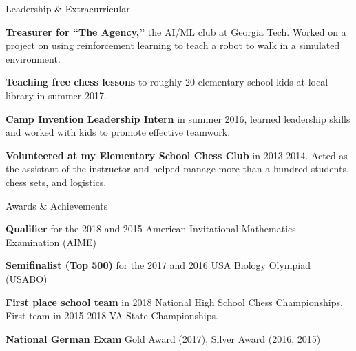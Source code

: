 \documentclass{template} %
\begin{document}
\begin{rSection}{Leadership \& Extracurricular} \itemsep -3pt \vspace{-3mm}
\item {\bf Treasurer for ``The Agency,''} the AI/ML club at Georgia Tech. Worked on a project on using reinforcement learning to teach a robot to walk in a simulated environment.
\item {\bf Teaching free chess lessons} to roughly 20 elementary school kids at local library in summer 2017.
\item {\bf Camp Invention Leadership Intern} in summer 2016, learned leadership skills and worked with kids to promote effective teamwork.
\item {\bf Volunteered at my Elementary School Chess Club} in 2013-2014. Acted as the assistant of the instructor and helped manage more than a hundred students, chess sets, and logistics.
\end{rSection}


\begin{rSection}{Awards \& Achievements} \itemsep -3pt \vspace{-3mm}
\item {\bf Qualifier} for the 2018 and 2015 American Invitational Mathematics Examination (AIME)
\item {\bf Semifinalist (Top 500)} for the 2017 and 2016 USA Biology Olympiad (USABO)
\item {\bf First place school team} in 2018 National High School Chess Championships. First team in 2015-2018 VA State Championships.
\item {\bf National German Exam} Gold Award (2017),
Silver Award (2016, 2015)
\end{rSection}
\end{document}
